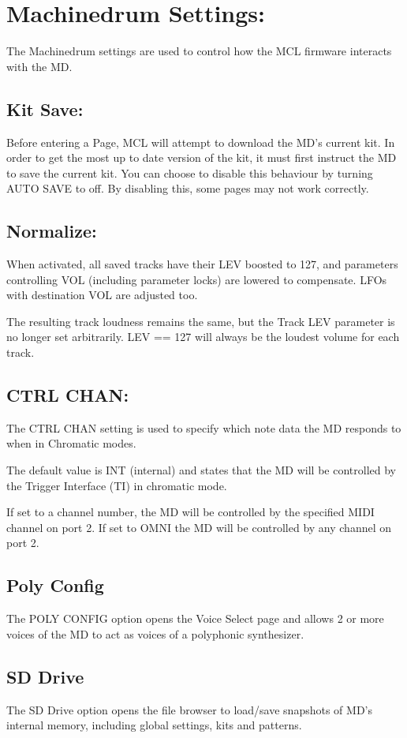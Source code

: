 \chapter{Machinedrum Settings:}
The Machinedrum settings are used to control how the MCL firmware interacts with the MD.

\section{Kit Save:}
Before entering a Page, MCL will attempt to download the MD’s current kit. In order to get
the most up to date version of the kit, it must first instruct the MD to save the current kit. You can choose to disable this behaviour by turning AUTO SAVE to off. By disabling this, some pages may not work correctly.
\section{Normalize:}
When activated, all saved tracks have their LEV boosted to 127, and parameters controlling VOL (including parameter locks) are lowered
to compensate. LFOs with destination VOL are 
adjusted too.

The resulting track loudness remains the same, but the Track LEV parameter is no longer set arbitrarily. LEV == 127 will always be the loudest volume for each track.
\section{CTRL CHAN:}
The CTRL CHAN setting is used to specify which note data the MD responds to when in Chromatic modes.

The default value is INT (internal) and states that the MD will be controlled by the Trigger Interface (TI) in chromatic mode.

If set to a channel number, the MD will be controlled by the specified MIDI channel on port 2. If set to OMNI the MD will be controlled by any channel on port 2.
\section{Poly Config}
The POLY CONFIG option opens the Voice Select page and allows 2 or more voices of the MD to act as voices of a polyphonic synthesizer.
\section{SD Drive}
The SD Drive option opens the file browser to load/save snapshots of MD's internal memory, including global settings, kits and patterns.